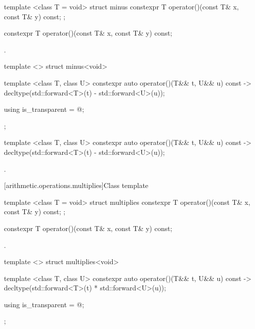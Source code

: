 %
\begin{itemdecl}
template <class T = void> struct minus {
  constexpr T operator()(const T& x, const T& y) const;
};
\end{itemdecl}

%
\begin{itemdecl}
constexpr T operator()(const T& x, const T& y) const;
\end{itemdecl}

\begin{itemdescr}
\pnum\returns {}.
\end{itemdescr}

%
\begin{itemdecl}
template <> struct minus<void> {
  template <class T, class U> constexpr auto operator()(T&& t, U&& u) const
    -> decltype(std::forward<T>(t) - std::forward<U>(u));

  using is_transparent = @\unspec@;
};
\end{itemdecl}

%
\begin{itemdecl}
template <class T, class U> constexpr auto operator()(T&& t, U&& u) const
    -> decltype(std::forward<T>(t) - std::forward<U>(u));
\end{itemdecl}

\begin{itemdescr}
\pnum\returns {}.
\end{itemdescr}

[arithmetic.operations.multiplies]{Class template }

%
\begin{itemdecl}
template <class T = void> struct multiplies {
  constexpr T operator()(const T& x, const T& y) const;
};
\end{itemdecl}

%
\begin{itemdecl}
constexpr T operator()(const T& x, const T& y) const;
\end{itemdecl}

\begin{itemdescr}
\pnum\returns {}.
\end{itemdescr}

%
\begin{itemdecl}
template <> struct multiplies<void> {
  template <class T, class U> constexpr auto operator()(T&& t, U&& u) const
    -> decltype(std::forward<T>(t) * std::forward<U>(u));

  using is_transparent = @\unspec@;
};
\end{itemdecl}

